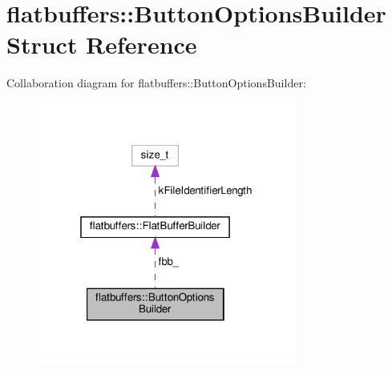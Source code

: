 \hypertarget{structflatbuffers_1_1ButtonOptionsBuilder}{}\section{flatbuffers\+:\+:Button\+Options\+Builder Struct Reference}
\label{structflatbuffers_1_1ButtonOptionsBuilder}


Collaboration diagram for flatbuffers\+:\+:Button\+Options\+Builder\+:
\nopagebreak
\begin{figure}[H]
\begin{center}
\leavevmode
\includegraphics[width=241pt]{structflatbuffers_1_1ButtonOptionsBuilder__coll__graph}
\end{center}
\end{figure}
